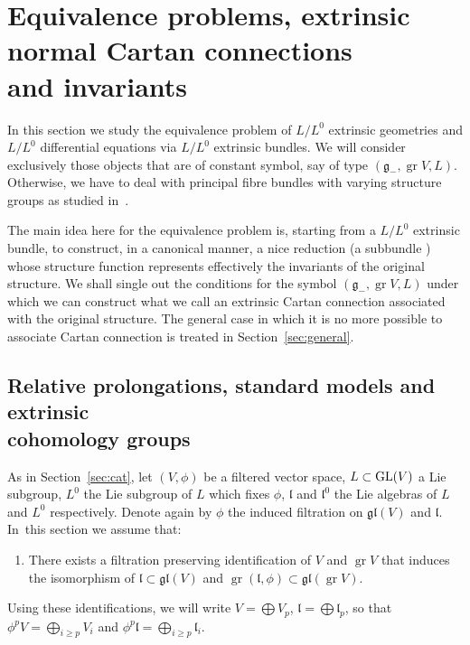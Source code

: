 \documentclass[pdftex]{sigma}%
\newcommand{\g}{\mathfrak g}
\newcommand{\gl}{\mathfrak{gl}}
\newcommand{\lf}{\mathfrak l}
\newcommand{\gr}{\operatorname{gr}}
\numberwithin{equation}{section}
\begin{document}
\section[Equivalence problems, extrinsic normal Cartan connections and invariants]
{Equivalence problems, extrinsic normal Cartan connections\\ and invariants}\label{sec5}

In this section we study the equivalence problem of $L/L^0$ extrinsic geometries and $L/L^0$ dif\-fe\-ren\-tial equations via $L/L^0$ extrinsic bundles. We will consider exclusively those objects that are of constant symbol, say of type $(\g_- , \gr V, L)$. Otherwise, we have to deal with principal fibre bundles with varying structure groups as studied in~\cite{Mor1983}.

The main idea here for the equivalence problem is, starting from a $L/L^0$ extrinsic bundle, to construct, in a canonical manner,
a nice reduction (a subbundle ) whose structure function represents effectively the invariants of the original structure. We shall single out the conditions for the symbol $(\g_-, \gr V, L)$ under which we can construct what we call an extrinsic Cartan connection associated with the original structure. The general case in which it is no more possible to associate Cartan connection is treated in Section~\ref{sec:general}.


\subsection[Relative prolongations, standard models and extrinsic cohomology groups]
{Relative prolongations, standard models and extrinsic \\cohomology groups}

As in Section~\ref{sec:cat}, let $(V, \phi)$ be a filtered vector space,
$L \subset {\rm GL}(V) $ a Lie subgroup, $L^0$ the Lie subgroup of $L$
which fixes $\phi$, $\lf$ and $\lf^0$ the Lie algebras of $L$ and $L^0$
respectively. Denote again by $\phi$ the induced filtration on
$\mathfrak{gl}(V)$ and $\lf$. In~this section we assume that:

\begin{enumerate}\itemsep=0pt
	\item[(C0)]
	There exists a filtration preserving identification of $V$ and $\gr V$ that induces the isomorphism of $\lf\subset \gl(V)$ and $\gr(\lf, \phi)\subset \gl(\gr V)$.
\end{enumerate}

Using these identifications, we will write $V = \bigoplus V_p$, $\lf = \bigoplus \lf_p$, so that $\phi^pV = \bigoplus _{ i \ge p} V_i$ and $\phi^p\lf = \bigoplus _{ i \ge p} \lf_i$.
\end{document}
